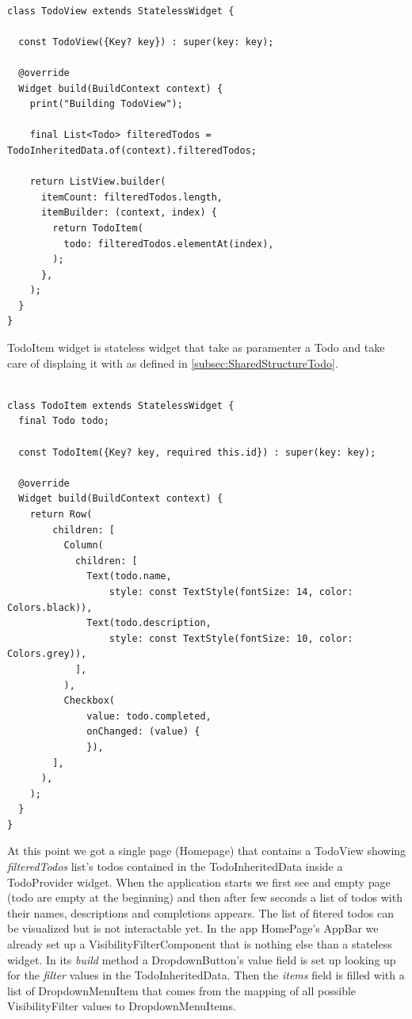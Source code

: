 \begin{verbatim}

class TodoView extends StatelessWidget {

  const TodoView({Key? key}) : super(key: key);

  @override
  Widget build(BuildContext context) {
    print("Building TodoView");

    final List<Todo> filteredTodos = TodoInheritedData.of(context).filteredTodos;

    return ListView.builder(
      itemCount: filteredTodos.length,
      itemBuilder: (context, index) {
        return TodoItem(
          todo: filteredTodos.elementAt(index),
        );
      },
    );
  }
}
\end{verbatim}

TodoItem widget is stateless widget that take as paramenter a Todo and take care of displaing it with as defined in \ref{subsec:SharedStructureTodo}.
\mbox{}\\


\begin{verbatim}

class TodoItem extends StatelessWidget {
  final Todo todo;

  const TodoItem({Key? key, required this.id}) : super(key: key);

  @override
  Widget build(BuildContext context) {
    return Row(
        children: [
          Column(
            children: [
              Text(todo.name,
                  style: const TextStyle(fontSize: 14, color: Colors.black)),
              Text(todo.description,
                  style: const TextStyle(fontSize: 10, color: Colors.grey)),
            ],
          ),
          Checkbox(
              value: todo.completed,
              onChanged: (value) {
              }),
        ],
      ),
    );
  }
}
\end{verbatim}

At this point we got a single page (Homepage) that contains a TodoView showing \textit{filteredTodos} list’s todos contained in the TodoInheritedData inside a TodoProvider widget. When the application starts we first see and empty page (todo are empty at the beginning) and then after few seconds a list of todos with their names, descriptions and completions appears. The list of fitered todos can be visualized but is not interactable yet. 
In the app HomePage’s AppBar we already set up a VisibilityFilterComponent that is nothing else than a stateless widget. In its \textit{build} method a DropdownButton’s value field is set up looking up for the \textit{filter} values in the TodoInheritedData. Then the \textit{items} field is filled with a list of DropdownMenuItem that comes from the mapping of all possible VisibilityFilter values to DropdownMenuItems.
\mbox{}\\


